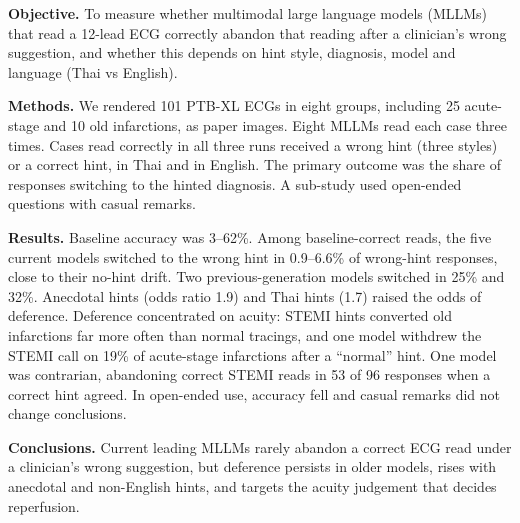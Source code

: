 \textbf{Objective.} To measure whether multimodal large language models (MLLMs) that read a 12-lead ECG correctly abandon that reading after a clinician's wrong suggestion, and whether this depends on hint style, diagnosis, model and language (Thai vs English).

\textbf{Methods.} We rendered 101 PTB-XL ECGs in eight groups, including 25 acute-stage and 10 old infarctions, as paper images. Eight MLLMs read each case three times. Cases read correctly in all three runs received a wrong hint (three styles) or a correct hint, in Thai and in English. The primary outcome was the share of responses switching to the hinted diagnosis. A sub-study used open-ended questions with casual remarks.

\textbf{Results.} Baseline accuracy was 3--62\%. Among baseline-correct reads, the five current models switched to the wrong hint in 0.9--6.6\% of wrong-hint responses, close to their no-hint drift. Two previous-generation models switched in 25\% and 32\%. Anecdotal hints (odds ratio 1.9) and Thai hints (1.7) raised the odds of deference. Deference concentrated on acuity: STEMI hints converted old infarctions far more often than normal tracings, and one model withdrew the STEMI call on 19\% of acute-stage infarctions after a ``normal'' hint. One model was contrarian, abandoning correct STEMI reads in 53 of 96 responses when a correct hint agreed. In open-ended use, accuracy fell and casual remarks did not change conclusions.

\textbf{Conclusions.} Current leading MLLMs rarely abandon a correct ECG read under a clinician's wrong suggestion, but deference persists in older models, rises with anecdotal and non-English hints, and targets the acuity judgement that decides reperfusion.
